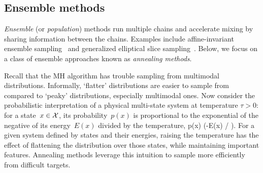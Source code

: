 \documentclass[angelino.tex]{subfiles}
\begin{document}

\subsection{Ensemble methods}
\label{sec:ensemble}

\emph{Ensemble} (or \emph{population}) methods run multiple chains and
accelerate mixing by sharing information between the chains.
Examples include affine-invariant ensemble
sampling~\citep{goodman-2010-ensemble} and
generalized elliptical slice sampling~\citep{nishihara-2014-gess}.
Below, we focus on a class of ensemble approaches known as
\emph{annealing methods}.

Recall that the MH algorithm has trouble sampling from multimodal distributions.
Informally, `flatter' distributions are easier to sample from compared to
`peaky' distributions, especially multimodal ones.
Now consider the probabilistic interpretation of a physical
multi-state system at temperature $\tau > 0$: for a state~$x \in {\mathcal X}$,
its probability~$p(x)$ is proportional to the exponential of the negative of
its energy~$E(x)$ divided by the temperature, \ie
\be
p(x) \propto \exp(-E(x) / \tau). \label{energy}
\ee
For a given system defined by states and their energies, raising the temperature
has the effect of flattening the distribution over those states, while
maintaining important features.
Annealing methods leverage this intuition to sample
more efficiently from difficult targets.

\end{document}

